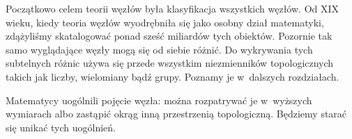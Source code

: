 Początkowo celem teorii węzłów była klasyfikacja wszystkich węzłów.
Od XIX wieku, kiedy teoria węzłów wyodrębniła się jako osobny dział matematyki, zdążyliśmy skatalogować ponad sześć miliardów tych obiektów.
Pozornie tak samo wyglądające węzły mogą się od siebie różnić.
Do wykrywania tych subtelnych różnic używa się przede wszystkim niezmienników topologicznych takich jak liczby, wielomiany bądź grupy.
Poznamy je w~dalszych rozdziałach.

Matematycy uogólnili pojęcie węzła: można rozpatrywać je w~wyższych wymiarach albo zastąpić okrąg inną przestrzenią topologiczną.
Będziemy starać się unikać tych uogólnień.

